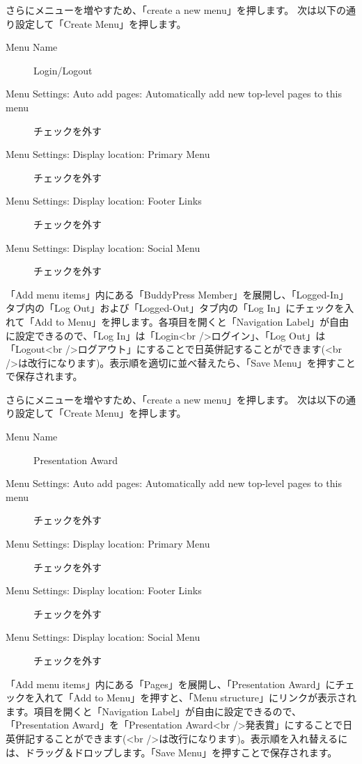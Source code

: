 \documentclass[titlepage,10pt,a4paper,uplatex]{jsbook}
\begin{document}
さらにメニューを増やすため、「create a new menu」を押します。
次は以下の通り設定して「Create Menu」を押します。

\begin{description}
\item[Menu Name] Login/Logout
\item[Menu Settings: Auto add pages: Automatically add new top-level pages to this menu] チェックを外す
\item[Menu Settings: Display location: Primary Menu] チェックを外す
\item[Menu Settings: Display location: Footer Links] チェックを外す
\item[Menu Settings: Display location: Social Menu] チェックを外す
\end{description}

「Add menu items」内にある「BuddyPress Member」を展開し、「Logged-In」タブ内の「Log Out」および「Logged-Out」タブ内の「Log In」にチェックを入れて「Add to Menu」を押します。各項目を開くと「Navigation Label」が自由に設定できるので、「Log In」は「Login{\textless}br /{\textgreater}ログイン」、「Log Out」は「Logout{\textless}br /{\textgreater}ログアウト」にすることで日英併記することができます({\textless}br /{\textgreater}は改行になります)。表示順を適切に並べ替えたら、「Save Menu」を押すことで保存されます。

さらにメニューを増やすため、「create a new menu」を押します。
次は以下の通り設定して「Create Menu」を押します。

\begin{description}
\item[Menu Name] Presentation Award
\item[Menu Settings: Auto add pages: Automatically add new top-level pages to this menu] チェックを外す
\item[Menu Settings: Display location: Primary Menu] チェックを外す
\item[Menu Settings: Display location: Footer Links] チェックを外す
\item[Menu Settings: Display location: Social Menu] チェックを外す
\end{description}

「Add menu items」内にある「Pages」を展開し、「Presentation Award」にチェックを入れて「Add to Menu」を押すと、「Menu structure」にリンクが表示されます。項目を開くと「Navigation Label」が自由に設定できるので、「Presentation Award」を「Presentation Award{\textless}br /{\textgreater}発表賞」にすることで日英併記することができます({\textless}br /{\textgreater}は改行になります)。表示順を入れ替えるには、ドラッグ＆ドロップします。「Save Menu」を押すことで保存されます。
\end{document}
